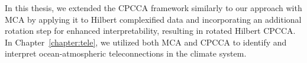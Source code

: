 In this thesis, we extended the CPCCA framework similarly to our approach with MCA by applying it to Hilbert complexified data and incorporating an additional rotation step for enhanced interpretability, resulting in rotated Hilbert CPCCA. In Chapter~\ref{chapter:tele}, we utilized both MCA and CPCCA to identify and interpret ocean-atmospheric teleconnections in the climate system.

\clearpage

